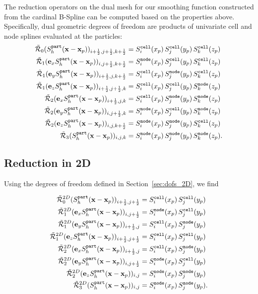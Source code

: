 \documentclass[11pt]{article}
\renewcommand{\part}{\texttt{part}}
\newcommand{\cell}{\texttt{cell}}
\newcommand{\node}{\texttt{node}}
\begin{document}
The reduction operators on the dual mesh for our smoothing function constructed from the cardinal B-Spline can be computed based on the properties above. 
Specifically, dual geometric degrees of freedom are products of univariate cell and node splines evaluated at the particles:
$$
\begin{aligned}
    \tcR_0(S^\part_h(\mathbf{x}-\mathbf{x}_p))_{\iph,\jph,\kph} &= S^\cell_i(x_p)\,S^\cell_j(y_p) \, S^\cell_k(z_p)\\
    \tcR_1(\mathbf{e}_x S^\part_h(\mathbf{x}-\mathbf{x}_p))_{i,\jph,\kph} &= S^\node_i(x_p)\,S^\cell_j(y_p) \, S^\cell_k(z_p)\\
    \tcR_1(\mathbf{e}_y S^\part_h(\mathbf{x}-\mathbf{x}_p))_{\iph,j,\kph} &= S^\cell_i(x_p)\,S^\node_j(y_p) \, S^\cell_k(z_p)\\
    \tcR_1(\mathbf{e}_z S^\part_h(\mathbf{x}-\mathbf{x}_p))_{\iph,\jph,k} &= S^\cell_i(x_p)\,S^\cell_j(y_p) \, S^\node_k(z_p)\\
    \tcR_2(\mathbf{e}_x S^\part_h(\mathbf{x}-\mathbf{x}_p))_{\iph,j,k} &= S^\cell_i(x_p)\,S^\node_j(y_p) \, S^\node_k(z_p)\\
    \tcR_2(\mathbf{e}_y S^\part_h(\mathbf{x}-\mathbf{x}_p))_{i,\jph,k} &= S^\node_i(x_p)\,S^\cell_j(y_p) \, S^\node_k(z_p)\\
    \tcR_2(\mathbf{e}_z S^\part_h(\mathbf{x}-\mathbf{x}_p))_{i,j,\kph} &= S^\node_i(x_p)\,S^\node_j(y_p) \, S^\cell_k(z_p)\\
    \tcR_3(S^\part_h(\mathbf{x}-\mathbf{x}_p))_{i,j,k}                &= S^\node_i(x_p)\,S^\node_j(y_p) \, S^\node_k(z_p).
\end{aligned}
$$

\subsection{Reduction in 2D}

Using the degrees of freedom defined in Section~\ref{sec:dofs_2D}, we find 

$$
\begin{aligned}
    \tcR^{2D}_0(S^\part_h(\mathbf{x}-\mathbf{x}_p))_{\iph,\jph}           &= S^\cell_i(x_p)\,S^\cell_j(y_p) \\
    \tcR^{2D}_1(\mathbf{e}_x S^\part_h(\mathbf{x}-\mathbf{x}_p))_{i,\jph} &= S^\node_i(x_p)\,S^\cell_j(y_p) \\
    \tcR^{2D}_1(\mathbf{e}_y S^\part_h(\mathbf{x}-\mathbf{x}_p))_{\iph,j} &= S^\cell_i(x_p)\,S^\node_j(y_p) \\
    \tcR^{2D}_1(\mathbf{e}_z S^\part_h(\mathbf{x}-\mathbf{x}_p))_{\iph,\jph} &= S^\cell_i(x_p)\,S^\cell_j(y_p) \\
    \tcR^{2D}_2(\mathbf{e}_x S^\part_h(\mathbf{x}-\mathbf{x}_p))_{\iph,j} &= S^\cell_i(x_p)\,S^\node_j(y_p) \\
    \tcR^{2D}_2(\mathbf{e}_y S^\part_h(\mathbf{x}-\mathbf{x}_p))_{i,\jph} &= S^\node_i(x_p)\,S^\cell_j(y_p) \\
    \tcR^{2D}_2(\mathbf{e}_z S^\part_h(\mathbf{x}-\mathbf{x}_p))_{i,j}    &= S^\node_i(x_p)\,S^\node_j(y_p) \\
    \tcR^{2D}_3(S^\part_h(\mathbf{x}-\mathbf{x}_p))_{i,j}                 &= S^\node_i(x_p)\,S^\node_j(y_p).
\end{aligned}
$$
\end{document}

